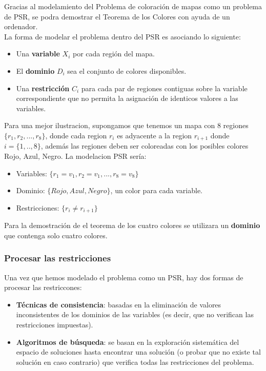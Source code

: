 \documentclass[a4paper]{article}
\begin{document}
Gracias al modelamiento del Problema de coloración de mapas como un problema de PSR, se podra demostrar el Teorema de los Colores con ayuda de un ordenador.\\ 

La forma de modelar el problema dentro del PSR es asociando lo siguiente:
\begin{itemize}
\item Una \textbf{variable} $X_i$ por cada región del mapa.
\item El \textbf{dominio} $D_i$ sea el conjunto de colores disponibles.
\item Una \textbf{restricción} $C_i$ para cada par de regiones contiguas sobre la variable correspondiente que no permita la asignación de identicos valores a las variables.
\end{itemize}

Para una mejor ilustracion, supongamos que tenemos un mapa con 8 regiones  $\{r_1, r_2,..., r_8\}$, donde cada region $r_i$ es adyacente a la region $r_{i+1}$ donde $i = \{1,..,8\}$, además las regiones deben ser coloreadas con los posibles colores Rojo, Azul, Negro. La modelacion PSR sería:
\begin{itemize}
\item Variables: $\{r_1 = v_1, r_2 = v_1,..., r_8 = v_8\}$
\item Dominio: $\{Rojo, Azul, Negro\}$, un color para cada variable.
\item Restricciones: $\{r_i \not= r_{i+1}\}$
\end{itemize}

Para la demostración de el teorema de los cuatro colores se utilizara un \textbf{dominio} que contenga solo cuatro colores.


\subsubsection{Procesar las restricciones}
Una vez que hemos modelado el problema como un PSR, hay dos formas de procesar las restriccones:

\begin{itemize}
	 
\item \textbf{Técnicas de consistencia}: basadas en la eliminación de valores inconsistentes de los dominios de las variables (es decir, que no verifican las restricciones impuestas).
\item \textbf{Algoritmos de búsqueda}: se basan en la exploración sistemática del espacio de soluciones hasta encontrar una solución (o probar que no existe tal solución en caso contrario) que verifica todas las restricciones del problema.
\end{itemize}
\end{document}
